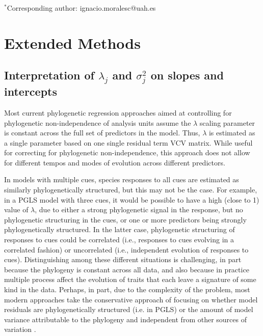 \documentclass[11pt]{article}
\def\labelitemi{--}
\begin{document}
\vspace{2ex}
$^*$Corresponding author: ignacio.moralesc@uah.es\\
\renewcommand{\thetable}{S\arabic{table}}
\renewcommand{\thefigure}{S\arabic{figure}}
\renewcommand{\labelitemi}{$-$}

\clearpage



\section*{Extended Methods}

\subsection*{Interpretation of $\lambda_j$ and $\sigma_j^2$ on slopes and intercepts}

Most current phylogenetic regression approaches aimed at controlling for phylogenetic non-independence of analysis units \citep[i.e. usually species, see][]{revell2010phylogenetic} assume the $\lambda$ scaling parameter is constant across the full set of predictors in the model. Thus, $\lambda$ is estimated as a single parameter based on one single residual term VCV matrix. While useful for correcting for phylogenetic non-independence, this approach does not allow for different tempos and modes of evolution across different predictors. 

In models with multiple cues, species responses to all cues are estimated as similarly phylogenetically structured, but this may not be the case. For example, in a PGLS model with three cues, it would be possible to have a high (close to 1) value of $\lambda$, due to either a strong phylogenetic signal in the response, but no phylogenetic structuring in the cues, or one or more predictors being strongly phylogenetically structured. In the latter case, phylogenetic structuring of responses to cues could be correlated (i.e., responses to cues evolving in a correlated fashion) or uncorrelated (i.e., independent evolution of responses to cues). Distinguishing among these different situations is challenging, in part because the phylogeny is constant across all data, and also because in practice multiple process affect the evolution of traits that each leave a signature of some kind in the data. Perhaps, in part, due to the complexity of the problem, most modern approaches take the conservative approach of focusing on whether model residuals are phylogenetically structured (i.e. in PGLS) or the amount of model variance attributable to the phylogeny and independent from other sources of variation \citep[i.e., in PMM, see][]{housworth2004phylogenetic}.
\end{document}
